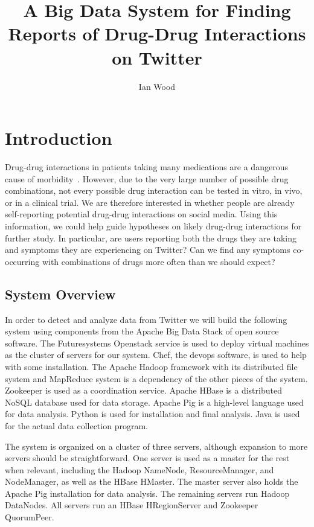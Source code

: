 \documentclass[letterpaper]{article}
\title{A Big Data System for Finding Reports of Drug-Drug Interactions on Twitter}
\author{Ian Wood}
\begin{document}
\maketitle
\section{Introduction}

Drug-drug interactions in patients taking many medications are a dangerous cause of morbidity~\citep{kolchinsky2013evaluation}. However, due to the very large number of possible drug combinations, not every possible drug interaction can be tested in vitro, in vivo, or in a clinical trial. We are therefore interested in whether people are already self-reporting potential drug-drug interactions on social media. Using this information, we could help guide hypotheses on likely drug-drug interactions for further study. In particular, are users reporting both the drugs they are taking and symptoms they are experiencing on Twitter? Can we find any symptoms co-occurring with combinations of drugs more often than we should expect?

\subsection{System Overview}

In order to detect and analyze data from Twitter we will build the following system using components from the Apache Big Data Stack of open source software. The Futuresystems Openstack service is used to deploy virtual machines as the cluster of servers for our system. Chef, the devops software, is used to help with some installation. The Apache Hadoop framework with its distributed file system and MapReduce system is a dependency of the other pieces of the system. Zookeeper is used as a coordination service. Apache HBase is a distributed NoSQL database used for data storage. Apache Pig is a high-level language used for data analysis. Python is used for installation and final analysis. Java is used for the actual data collection program.

The system is organized on a cluster of three servers, although expansion to more servers should be straightforward. One server is used as a master for the rest when relevant, including the Hadoop NameNode, ResourceManager, and NodeManager, as well as the HBase HMaster. The master server also holds the Apache Pig installation for data analysis. The remaining servers run Hadoop DataNodes. All servers run an HBase HRegionServer and Zookeeper QuorumPeer.
\end{document}
